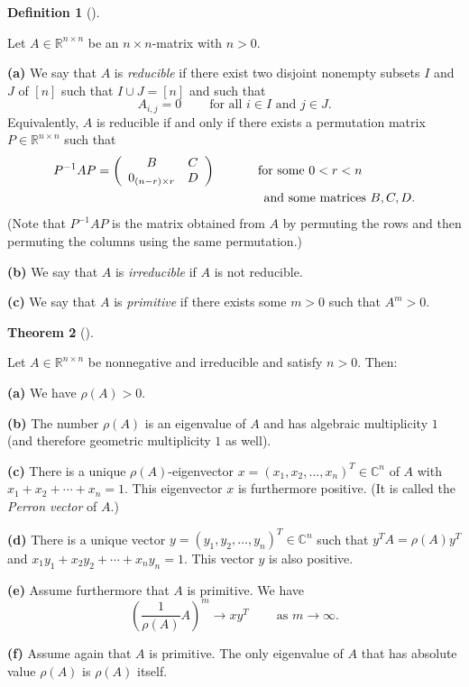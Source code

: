 \documentclass[numbers=enddot,12pt,final,onecolumn,notitlepage]{scrartcl}%
\numberwithin{exer}{subsection}
\theoremstyle{definition}
\newtheorem{theo}{Theorem}[subsection]
\newenvironment{theorem}[1][]
{\begin{theo}[#1]\begin{leftbar}}
{\end{leftbar}\end{theo}}
\newtheorem{defi}[theo]{Definition}
\newenvironment{definition}[1][]
{\begin{defi}[#1]\begin{leftbar}}
{\end{leftbar}\end{defi}}
\begin{document}
\begin{definition}
Let $A\in\mathbb{R}^{n\times n}$ be an $n\times n$-matrix with $n>0$. \medskip

\textbf{(a)} We say that $A$ is \emph{reducible} if there exist two disjoint
nonempty subsets $I$ and $J$ of $\left[  n\right]  $ such that $I\cup
J=\left[  n\right]  $ and such that%
\[
A_{i,j}=0\ \ \ \ \ \ \ \ \ \ \text{for all }i\in I\text{ and }j\in J.
\]
Equivalently, $A$ is reducible if and only if there exists a permutation
matrix $P\in\mathbb{R}^{n\times n}$ such that%
\begin{align*}
P^{-1}AP  &  =\left(
\begin{array}
[c]{cc}%
B & C\\
0_{\left(  n-r\right)  \times r} & D
\end{array}
\right)  \ \ \ \ \ \ \ \ \ \ \text{for some }0<r<n\\
&
\ \ \ \ \ \ \ \ \ \ \ \ \ \ \ \ \ \ \ \ \ \ \ \ \ \ \ \ \ \ \ \ \ \ \ \ \ \ \ \ \text{and
some matrices }B,C,D.
\end{align*}
(Note that $P^{-1}AP$ is the matrix obtained from $A$ by permuting the rows
and then permuting the columns using the same permutation.) \medskip

\textbf{(b)} We say that $A$ is \emph{irreducible} if $A$ is not reducible.
\medskip

\textbf{(c)} We say that $A$ is \emph{primitive} if there exists some $m>0$
such that $A^{m}>0$.
\end{definition}

\begin{theorem}
[Perron--Frobenius theorem 2]\label{thm.posmat.pf2}Let $A\in\mathbb{R}%
^{n\times n}$ be nonnegative and irreducible and satisfy $n>0$. Then: \medskip

\textbf{(a)} We have $\rho\left(  A\right)  >0$. \medskip

\textbf{(b)} The number $\rho\left(  A\right)  $ is an eigenvalue of $A$ and
has algebraic multiplicity $1$ (and therefore geometric multiplicity $1$ as
well). \medskip

\textbf{(c)} There is a unique $\rho\left(  A\right)  $-eigenvector $x=\left(
x_{1},x_{2},\ldots,x_{n}\right)  ^{T}\in\mathbb{C}^{n}$ of $A$ with
$x_{1}+x_{2}+\cdots+x_{n}=1$. This eigenvector $x$ is furthermore positive.
(It is called the \emph{Perron vector} of $A$.) \medskip

\textbf{(d)} There is a unique vector $y=\left(  y_{1},y_{2},\ldots
,y_{n}\right)  ^{T}\in\mathbb{C}^{n}$ such that $y^{T}A=\rho\left(  A\right)
y^{T}$ and $x_{1}y_{1}+x_{2}y_{2}+\cdots+x_{n}y_{n}=1$. This vector $y$ is
also positive. \medskip

\textbf{(e)} Assume furthermore that $A$ is primitive. We have%
\[
\left(  \dfrac{1}{\rho\left(  A\right)  }A\right)  ^{m}\rightarrow
xy^{T}\ \ \ \ \ \ \ \ \ \ \text{as }m\rightarrow\infty.
\]


\textbf{(f)} Assume again that $A$ is primitive. The only eigenvalue of $A$
that has absolute value $\rho\left(  A\right)  $ is $\rho\left(  A\right)  $ itself.
\end{theorem}
\end{document}
